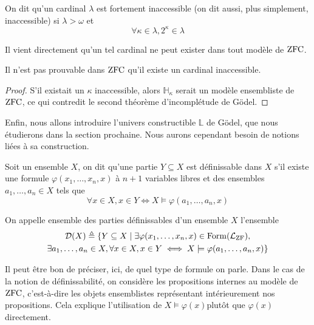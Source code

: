 \begin{definition}
  On dit qu'un cardinal $\lambda$ est fortement inaccessible (on dit aussi, plus
  simplement, inaccessible) si $\lambda > \omega$ et
  \[\forall \kappa \in \lambda, 2^\kappa \in \lambda\]
\end{definition}

Il vient directement qu'un tel cardinal ne peut exister dans tout modèle de
$\operatorname{ZFC}$.

\begin{proposition}
  Il n'est pas prouvable dans $\operatorname{ZFC}$ qu'il existe un cardinal inaccessible.
\end{proposition}

\begin{proof}
  S'il existait un $\kappa$ inaccessible, alors $\mathbb H_\kappa$ serait un
  modèle ensembliste de $\operatorname{ZFC}$, ce qui contredit le second théorème
  d'incomplétude de Gödel.
\end{proof}

Enfin, nous allons introduire l'univers constructible $\mathbb L$ de Gödel, que
nous étudierons dans la section prochaine. Nous aurons cependant besoin de
notions liées à sa construction.

\begin{definition}
  Soit un ensemble $X$, on dit qu'une partie $Y\subseteq X$ est définissable
  dans $X$ s'il existe une formule $\varphi(x_1,\ldots,x_n,x)$ à $n+1$ variables
  libres et des ensembles $a_1,\ldots,a_n \in X$ tels que
  \[\forall x \in X, x \in Y \iff X\models \varphi(a_1,\ldots,a_n,x)\]

  On appelle ensemble des parties définissables d'un ensemble $X$ l'ensemble
  \begin{multline*}
    \mathcal{D}(X) \triangleq \{Y \subseteq X \mid \exists
    \varphi(x_1,\ldots,x_n,x)\in\operatorname{Form}(\mathcal L_{\operatorname{ZF}}),\\
    \exists a_1,\ldots,a_n \in X,
    \forall x \in X, x \in Y \iff X \models \varphi(a_1,\ldots,a_n,x)\}
  \end{multline*}
\end{definition}

\begin{remark}
  Il peut être bon de préciser, ici, de quel type de formule on parle. Dans le
  cas de la notion de définissabilité, on considère les propositions internes
  au modèle de $\operatorname{ZFC}$, c'est-à-dire les objets ensemblistes représentant
  intérieurement nos propositions. Cela explique l'utilisation de
  \og $X\models \varphi(x)$\fg plutôt que \og$\varphi(x)$\fg directement.
\end{remark}


